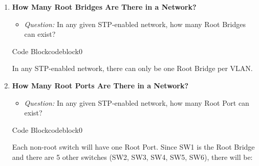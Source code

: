 \documentclass[a4paper]{book}
\begin{document}
\begin{enumerate}
\begin{ocg}{Code Block}{codeblock}{0}
\begin{tcolorbox}
{\begin{itemize}
        \item \textbf{SW6:}
        \begin{itemize}
            \item \textit{F0/1 $\rightarrow$ SW4 (cost = 19) + G0/1 $\rightarrow$ SW1 (cost = 4) = 23}
        \end{itemize}
    \end{itemize}
}
\end{tcolorbox}
\end{ocg}

    
    \item \textbf{How Many Root Bridges Are There in a Network?}
    \begin{itemize}
        \item \textit{Question:} In any given STP-enabled network, how many Root Bridges can exist?
    \end{itemize}

        
        \begin{ocg}{Code Block}{codeblock}{0}
        \vspace{0.5cm}
        \begin{tcolorbox}
        \small{
            In any STP-enabled network, there can only be one Root Bridge per VLAN.
        }
        \end{tcolorbox}
        \end{ocg}
        


    \item \textbf{How Many Root Ports Are There in a Network?}
    \begin{itemize}
        \item \textit{Question:} In any given STP-enabled network, how many Root Port can exist?
    \end{itemize}

        
        \begin{ocg}{Code Block}{codeblock}{0}
        \vspace{0.5cm}
        \begin{tcolorbox}
        \small{
            Each non-root switch will have one Root Port. Since SW1 is the Root Bridge and there are 5 other switches (SW2, SW3, SW4, SW5, SW6), there will be:

}
\end{tcolorbox}
\end{ocg}
\end{enumerate}
\end{document}

